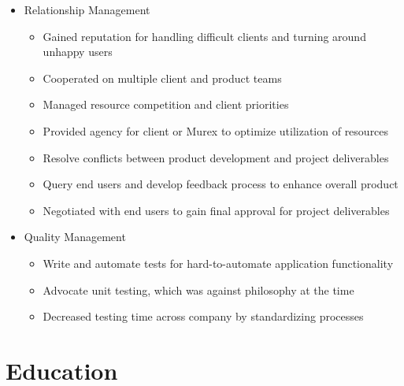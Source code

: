 \begin{itemize}
    \item{Relationship Management}
    \begin{itemize}
        \item Gained reputation for handling difficult clients and turning around unhappy users
        \item Cooperated on multiple client and product teams
        \item Managed resource competition and client priorities
        \item Provided agency for client or Murex to optimize utilization of resources
        \item Resolve conflicts between product development and project deliverables
        \item Query end users and develop feedback process to enhance overall product
        \item Negotiated with end users to gain final approval for project deliverables
    \end{itemize}

    \item{Quality Management}
    \begin{itemize}
        \item Write and automate tests for hard-to-automate application functionality
        \item Advocate unit testing, which was against philosophy at the time
        \item Decreased testing time across company by standardizing processes\newline{}
    \end{itemize}
\end{itemize}



\section{Education}

